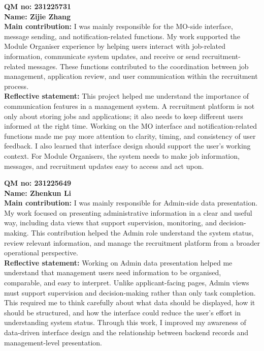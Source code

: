 \documentclass[11pt,a4paper]{article}
\begin{document}
{\vspace{6pt}

\textbf{QM no: 231225731}\\
\textbf{Name: Zijie Zhang}\\
\textbf{Main contribution:} I was mainly responsible for the MO-side interface, message sending, and notification-related functions. My work supported the Module Organiser experience by helping users interact with job-related information, communicate system updates, and receive or send recruitment-related messages. These functions contributed to the coordination between job management, application review, and user communication within the recruitment process.\\
\textbf{Reflective statement:} This project helped me understand the importance of communication features in a management system. A recruitment platform is not only about storing jobs and applications; it also needs to keep different users informed at the right time. Working on the MO interface and notification-related functions made me pay more attention to clarity, timing, and consistency of user feedback. I also learned that interface design should support the user's working context. For Module Organisers, the system needs to make job information, messages, and recruitment updates easy to access and act upon.

\vspace{6pt}

\textbf{QM no: 231225649}\\
\textbf{Name: Zhenkun Li}\\
\textbf{Main contribution:} I was mainly responsible for Admin-side data presentation. My work focused on presenting administrative information in a clear and useful way, including data views that support supervision, monitoring, and decision-making. This contribution helped the Admin role understand the system status, review relevant information, and manage the recruitment platform from a broader operational perspective.\\
\textbf{Reflective statement:} Working on Admin data presentation helped me understand that management users need information to be organised, comparable, and easy to interpret. Unlike applicant-facing pages, Admin views must support supervision and decision-making rather than only task completion. This required me to think carefully about what data should be displayed, how it should be structured, and how the interface could reduce the user's effort in understanding system status. Through this work, I improved my awareness of data-driven interface design and the relationship between backend records and management-level presentation.

}
\end{document}
